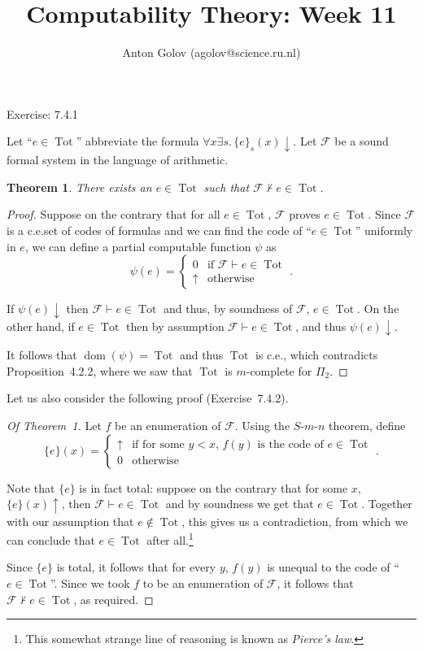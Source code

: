 \documentclass{article}
\title{Computability Theory: Week 11}
\author{Anton Golov (agolov@science.ru.nl)}
\newtheorem{theorem}{Theorem}
\newcommand{\set}[1]{\{ #1 \}}
\newcommand{\terminates}{\!\!\downarrow}
\newcommand{\diverges}{\!\!\uparrow}
\DeclareMathOperator{\Tot}{Tot}
\DeclareMathOperator{\dom}{dom}
\begin{document}
  \maketitle

  Exercise: 7.4.1

  Let ``$e \in \Tot$'' abbreviate the formula $\forall x \exists s. \, \set{e}_s(x)\terminates$.  Let $\mathcal{F}$ be a
  sound formal system in the language of arithmetic.

  \begin{theorem}
    There exists an $e \in \Tot$ such that $\mathcal{F} \not\vdash e \in \Tot$.
  \end{theorem}

  \begin{proof}
    Suppose on the contrary that for all $e \in \Tot$, $\mathcal{F}$ proves $e \in \Tot$.  Since $\mathcal{F}$ is a
    c.e.\@ set of codes of formulas and we can find the code of ``$e \in \Tot$'' uniformly in $e$, we can define a
    partial computable function $\psi$ as
    \[
      \psi(e) =
      \begin{cases}
        0 & \text{if $\mathcal{F} \vdash e \in \Tot$}\\
        \uparrow & \text{otherwise}
      \end{cases}.
    \]

    If $\psi(e)\terminates$ then $\mathcal{F} \vdash e \in \Tot$ and thus, by soundness of $\mathcal{F}$, $e \in \Tot$.
    On the other hand, if $e \in \Tot$ then by assumption $\mathcal{F} \vdash e \in \Tot$, and thus
    $\psi(e)\terminates$.

    It follows that $\dom(\psi) = \Tot$ and thus $\Tot$ is c.e., which contradicts Proposition~4.2.2, where we saw that
    $\Tot$ is $m$-complete for $\Pi_2$.
  \end{proof}

  Let us also consider the following proof (Exercise~7.4.2).

  \begin{proof}[Of Theorem~1]
    Let $f$ be an enumeration of $\mathcal{F}$.  Using the $S$-$m$-$n$ theorem, define
    \[
      \set{e}(x) =
      \begin{cases}
        \uparrow & \text{if for some $y < x$, $f(y)$ is the code of $e \in \Tot$}\\
        0 & \text{otherwise}
      \end{cases}.
    \]

    Note that $\set{e}$ is in fact total: suppose on the contrary that for some $x$, $\set{e}(x)\diverges$, then
    $\mathcal{F} \vdash e \in \Tot$ and by soundness we get that $e \in \Tot$.  Together with our assumption that
    $e \not \in \Tot$, this gives us a contradiction, from which we can conclude that $e \in \Tot$ after
    all.\footnote{This somewhat strange line of reasoning is known as \emph{Pierce's law}.}

    Since $\set{e}$ is total, it follows that for every $y$, $f(y)$ is unequal to the code of ``$e \in \Tot$''.  Since
    we took $f$ to be an enumeration of $\mathcal{F}$, it follows that $\mathcal{F} \not \vdash e \in \Tot$, as
    required.
  \end{proof}
\end{document}
